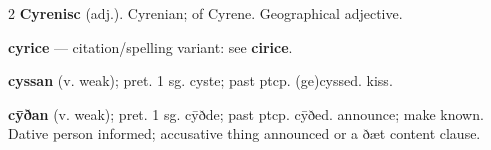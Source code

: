 \begin{multicols*}{2}
\textbf{Cyrenisc} (adj.). Cyrenian; of Cyrene. Geographical adjective.\par
\textbf{cyrice} — citation/spelling variant: see \textbf{cirice}.\par
\textbf{cyssan} (v. weak); pret. 1 sg. cyste; past ptcp. (ge)cyssed. kiss.\par
\textbf{cȳðan} (v. weak); pret. 1 sg. cȳðde; past ptcp. cȳðed. announce; make known. Dative person informed; accusative thing announced or a ðæt content clause.\par

\end{multicols*}
